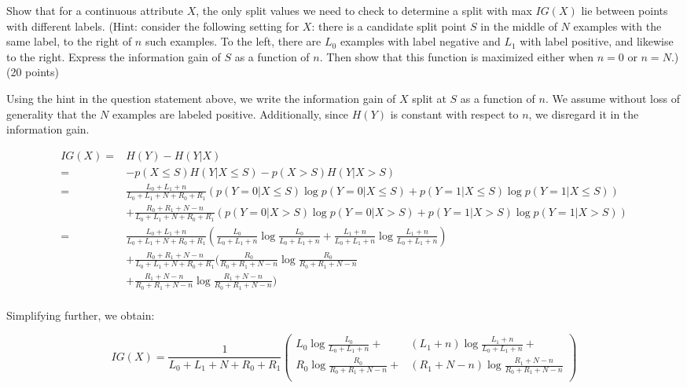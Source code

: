 \documentclass[fleqn]{homework}
\begin{document}
  \begin{problem}{4}
    \begin{question}
      Show that for a continuous attribute $X$, the only split values we need to
      check to determine a split with max $IG(X)$ lie between points with
      different labels.  (Hint: consider the following setting for $X$: there is
      a candidate split point $S$ in the middle of $N$ examples with the same
      label, to the right of $n$ such examples.  To the left, there are $L_0$
      examples with label negative and $L_1$ with label positive, and likewise
      to the right.  Express the information gain of $S$ as a function of $n$.
      Then show that this function is maximized either when $n=0$ or $n=N$.) (20
      points)
    \end{question}

    Using the hint in the question statement above, we write the information
    gain of $X$ split at $S$ as a function of $n$.  We assume without loss of
    generality that the $N$ examples are labeled positive.  Additionally, since
    $H(Y)$ is constant with respect to $n$, we disregard it in the information
    gain.

    \begin{align*}
      IG(X)
      =& H(Y) - H(Y|X) \\
      =& -p(X \le S) H(Y|X \le S) - p(X > S) H(Y|X > S) \\
      =& \frac{L_0+L_1+n}{L_0+L_1+N+R_0+R_1} \left(
           p(Y=0|X \le S) \log p(Y=0| X \le S) + p(Y=1|X \le S) \log p(Y=1|X \le S)
         \right)\\
       &+ \frac{R_0+R_1+N-n}{L_0+L_1+N+R_0+R_1} \left(
           p(Y=0|X > S) \log p(Y=0| X > S) + p(Y=1|X > S) \log p(Y=1|X > S)
         \right) \\
      =& \frac{L_0+L_1+n}{L_0+L_1+N+R_0+R_1} \left(
           \frac{L_0}{L_0+L_1+n} \log \frac{L_0}{L_0+L_1+n}
           + \frac{L_1+n}{L_0+L_1+n} \log \frac{L_1+n}{L_0+L_1+n}
         \right)\\
       &+ \frac{R_0+R_1+N-n}{L_0+L_1+N+R_0+R_1} \bigg(
         \frac{R_0}{R_0+R_1+N-n} \log \frac{R_0}{R_0+R_1+N-n}\\
       &+ \frac{R_1+N-n}{R_0+R_1+N-n} \log \frac{R_1+N-n}{R_0+R_1+N-n} \bigg) \\
    \end{align*}

    Simplifying further, we obtain:

    \begin{equation*}
      IG(X) = \frac{1}{L_0+L_1+N+R_0+R_1} \left(
    \begin{aligned}
      L_0 \log \frac{L_0}{L_0+L_1+n}+ &(L_1+n) \log \frac{L_1+n}{L_0+L_1+n}+ \\
      R_0 \log \frac{R_0}{R_0+R_1+N-n}+ &(R_1+N-n) \log \frac{R_1+N-n}{R_0+R_1+N-n}\\
    \end{aligned} \right)
    \end{equation*}


\end{problem}
\end{document}
